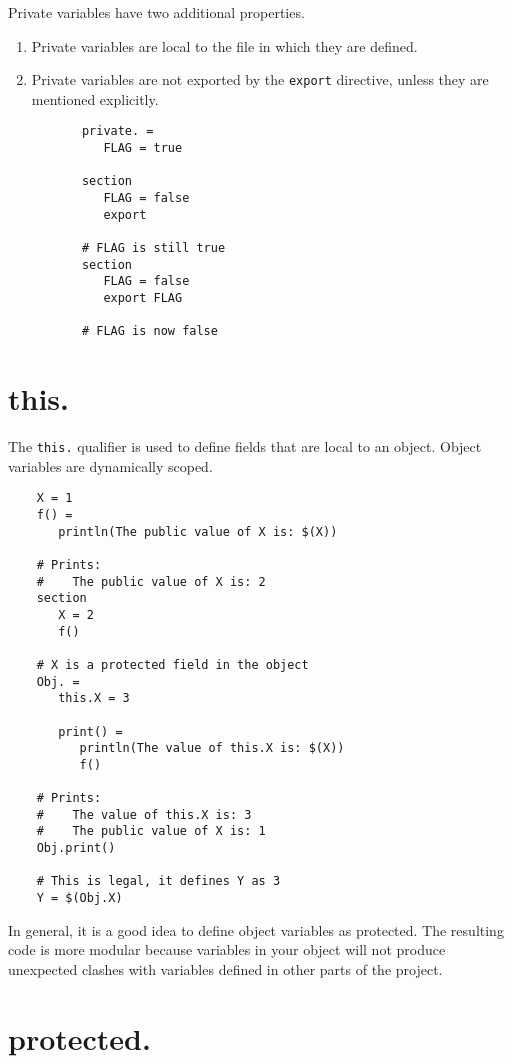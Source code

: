 Private variables have two additional properties.

\begin{enumerate}
\item Private variables are local to the file in which they are defined.
\item Private variables are not exported by the \verb+export+ directive, unless they are
  mentioned explicitly.

  \begin{verbatim}
       private. =
          FLAG = true

       section
          FLAG = false
          export

       # FLAG is still true
       section
          FLAG = false
          export FLAG

       # FLAG is now false
  \end{verbatim}
\end{enumerate}

\section{this.}

The \verb+this.+ qualifier is used to define fields that are local to an object.
Object variables are dynamically scoped.

\begin{verbatim}
    X = 1
    f() =
       println(The public value of X is: $(X))

    # Prints:
    #    The public value of X is: 2
    section
       X = 2
       f()

    # X is a protected field in the object
    Obj. =
       this.X = 3

       print() =
          println(The value of this.X is: $(X))
          f()

    # Prints:
    #    The value of this.X is: 3
    #    The public value of X is: 1
    Obj.print()

    # This is legal, it defines Y as 3
    Y = $(Obj.X)
\end{verbatim}

In general, it is a good idea to define object variables as protected.  The resulting code is more
modular because variables in your object will not produce unexpected clashes with variables defined
in other parts of the project.

\section{protected.}
\label{section:protected}

